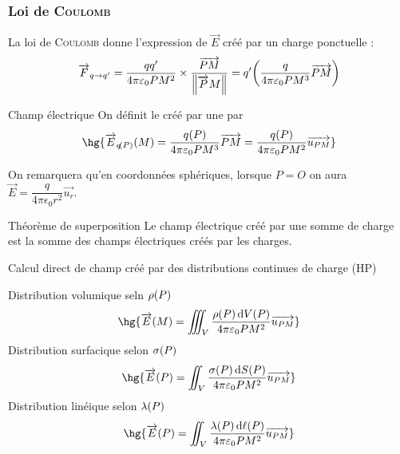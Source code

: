 \documentclass[a4paper,french,bookmarks]{book}
\begin{document}
    \subsubsection{Loi de \textsc{Coulomb}} %
    La loi de \textsc{Coulomb} donne l'expression de $\vec E$ créé par un charge ponctuelle :
    \[ \overrightarrow{F}_{q\to q'} = \dfrac{qq'}{4\pi\varepsilon_0 PM^2}\times\dfrac{\overrightarrow{PM}}{\left\lVert\overrightarrow{P}M\right\rVert} = q'\!\left(\dfrac{q}{4\pi\varepsilon_0PM^3}\overrightarrow{PM}\right)\]
    \begin{definition}{Champ électrique}{}
        On définit le  créé par une  par
        \[ \hg{ \vec E_{q\p{P}}\p{M} = \dfrac{q\p{P}}{4\pi\epsilon_0PM^3}\vec{PM} = \dfrac{q\p{P}}{4\pi\epsilon_0PM^2}\vec{u_{PM}}} \]
    \end{definition}
    
    On remarquera qu'en coordonnées sphériques, lorsque $P = O$ on aura $\vec E = \dfrac{q}{4\pi \epsilon_0 r^2}\vec{u_r}$.

    \begin{theorem}{Théorème de superposition}{}
        Le champ électrique créé par une somme de charge est la somme des champs électriques créés par les charges.
    \end{theorem}
    
    \begin{form}{Calcul direct de champ créé par des distributions continues de charge (HP)}{}
        \begin{enumerate}
            \itt Distribution volumique seln $\rho\!\left(P\right)$
            \[ \hg{\vec E \p{M} = \iiint_V \dfrac{\rho\p{P} \dif V\p{P}}{4\pi \epsilon_0 PM^2} \vec{u_{PM}}}\]
            \itt Distribution surfacique selon $\sigma\!\left(P\right)$ 
            \[ \hg{ \vec E\p{P} = \niint_V \dfrac{\sigma\p{P} \dif S\p{P}}{4\pi \epsilon_0 PM^2} \vec{u_{PM}}} \]
            \itt Distribution linéique selon $\lambda\!\left(P\right)$ 
            \[ \hg{ \vec E\p{P} = \niint_V \dfrac{\lambda\p{P} \dif \ell\p{P}}{4\pi \epsilon_0 PM^2} \vec{u_{PM}}} \]
        \end{enumerate}
    \end{form}
\end{document}
